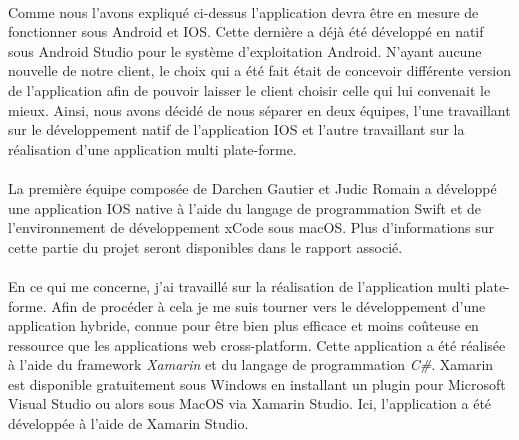 	\paragraph{}
		Comme nous l'avons expliqué ci-dessus l'application devra être en mesure de fonctionner sous Android et IOS. Cette dernière a déjà été développé en natif sous Android Studio pour le système d'exploitation Android. N'ayant aucune nouvelle de notre client, le choix qui a été fait était de concevoir différente version de l'application afin de pouvoir laisser le client choisir celle qui lui convenait le mieux. Ainsi, nous avons décidé de nous séparer en deux équipes, l'une travaillant sur le développement natif de l'application IOS et l'autre travaillant sur la réalisation d'une application multi plate-forme.
		
	\paragraph{}
		La première équipe composée de Darchen Gautier et Judic Romain a développé une application IOS native à l'aide du langage de programmation Swift et de l'environnement de développement xCode sous macOS. Plus d'informations sur cette partie du projet seront disponibles dans le rapport associé.
		
	\paragraph{}
		En ce qui me concerne, j'ai travaillé sur la réalisation de l'application multi plate-forme. Afin de procéder à cela je me suis tourner vers le développement d'une application hybride, connue pour être bien plus efficace et moins coûteuse en ressource que les applications web cross-platform. Cette application a été réalisée à l'aide du framework \emph{Xamarin} et du langage de programmation \emph{C\#}. Xamarin est disponible gratuitement sous Windows en installant un plugin pour Microsoft Visual Studio ou alors sous MacOS via Xamarin Studio. Ici, l'application a été développée à l'aide de Xamarin Studio. 	 
		   	